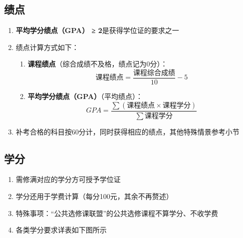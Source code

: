 \vspace*{-15pt}

\subsection[绩点]{绩点}
\label{gpa} %
\begin{enumerate}
    \item \textbf{平均学分绩点（GPA） ≥ 2}是获得学位证的要求之一
    \item 绩点计算方式如下：
          \begin{enumerate}
              \item \textbf{课程绩点}（综合成绩不及格，绩点记为0分）：
                    \begin{equation}
                        课程绩点 = \frac{课程综合成绩}{10} - 5
                    \end{equation}
              \item \textbf{平均学分绩点（GPA）}（平均绩点）：
                    \begin{equation}
                        GPA = \frac{\sum (课程绩点 \times 课程学分)}{\sum 课程学分}
                    \end{equation}
          \end{enumerate}\pagebreak[3]
    \item 补考合格的科目按60分计，同时获得相应的绩点，其他特殊情景参考小节
\end{enumerate}

\subsection[学分]{学分}
\begin{enumerate}
    \item 需修满对应的学分方可授予学位证
    \item 学分还用于学费计算（每分100元，其余不再赘述）
    \item 特殊事项：“公共选修课联盟”的公共选修课程不算学分、不收学费
    \item 各类学分要求详表\footnotemark 如下图所示
\end{enumerate}

